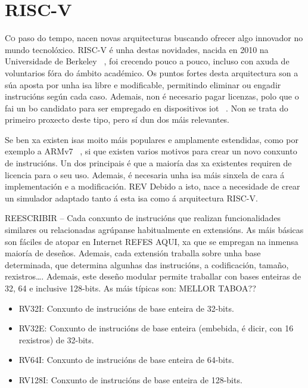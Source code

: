 \chapter{RISC-V}
\label{chap:riscv}

\lettrine{C}{o} paso do tempo, nacen novas arquitecturas buscando ofrecer algo innovador no mundo tecnolóxico. RISC-V é unha destas novidades, nacida en 2010 na Universidade de Berkeley ~\cite{WikipediaRISCV}, foi crecendo pouco a pouco, incluso con axuda de voluntarios fóra do ámbito académico. Os puntos fortes desta arquitectura son a súa aposta por unha \acrfull{isa} libre e modificable, permitindo eliminar ou engadir instrucións según cada caso. Ademais, non é necesario pagar licenzas, polo que o fai un bo candidato para ser empregado en dispositivos \acrfull{iot} ~\cite{RISCV_IoT}. Non se trata do primeiro proxecto deste tipo, pero sí dun dos máis relevantes. 

Se ben xa existen \acrshort{isa}s moito máis populares e amplamente estendidas, como por exemplo a ARMv7 ~\cite{Waterman:EECS-2016-1}, si que existen varios motivos para crear un novo conxunto de instrucións. Un dos principais é que a maioría das xa existentes requiren de licencia para o seu uso. Ademais, é necesaria unha \acrshort{isa} máis sinxela de cara á implementación e a modificación. REV Debido a isto, nace a necesidade de crear un simulador adaptado tanto á esta \acrshort{isa} como á arquitectura RISC-V.

REESCRIBIR -- Cada conxunto de instrucións que realizan funcionalidades similares ou relacionadas agrúpanse habitualmente en extensións. As máis básicas son fáciles de atopar en Internet REFES AQUI, xa que se empregan na inmensa maioría de deseños. Ademais, cada extensión traballa sobre unha base determinada, que determina algunhas das instrucións, a codificación, tamaño, rexistros\dots. Ademais, este deseño modular permite traballar con bases enteiras de 32, 64 e inclusive 128-bits. As máis típicas son: 
MELLOR TABOA??
\begin{itemize}
    \item RV32I: Conxunto de instrucións de base enteira de 32-bits.
    \item RV32E: Conxunto de instrucións de base enteira (embebida, é dicir, con 16 rexistros) de 32-bits.
    \item RV64I: Conxunto de instrucións de base enteira de 64-bits.
    \item RV128I: Conxunto de instrucións de base enteira de 128-bits.
\end{itemize}

